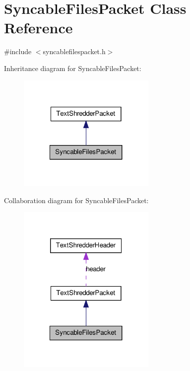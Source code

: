 \hypertarget{class_syncable_files_packet}{
\section{SyncableFilesPacket Class Reference}
\label{class_syncable_files_packet}
}


{\ttfamily \#include $<$syncablefilespacket.h$>$}



Inheritance diagram for SyncableFilesPacket:\nopagebreak
\begin{figure}[H]
\begin{center}
\leavevmode
\includegraphics[width=188pt]{class_syncable_files_packet__inherit__graph}
\end{center}
\end{figure}


Collaboration diagram for SyncableFilesPacket:\nopagebreak
\begin{figure}[H]
\begin{center}
\leavevmode
\includegraphics[width=188pt]{class_syncable_files_packet__coll__graph}
\end{center}
\end{figure}
